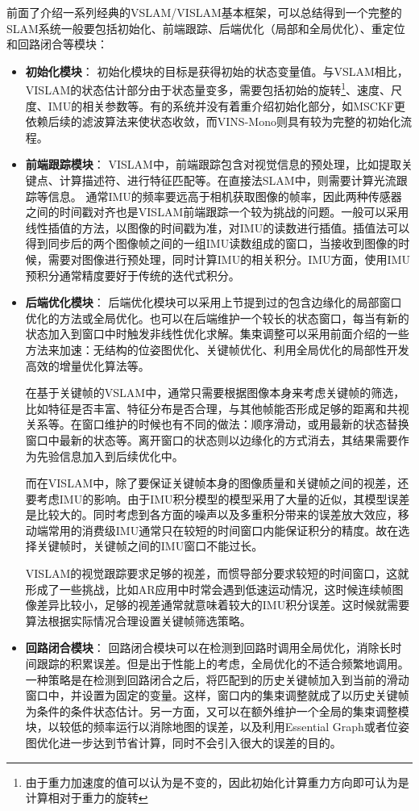 前面了介绍一系列经典的VSLAM/VISLAM基本框架，可以总结得到一个完整的SLAM系统一般要包括初始化、前端跟踪、后端优化（局部和全局优化）、重定位和回路闭合等模块：
\begin{itemize}
    \item \textbf{初始化模块}：
    初始化模块的目标是获得初始的状态变量值。与VSLAM相比，VISLAM的状态估计部分由于状态量变多，需要包括初始的旋转\footnote{由于重力加速度的值可以认为是不变的，因此初始化计算重力方向即可认为是计算相对于重力的旋转}、速度、尺度、IMU的相关参数等。有的系统并没有着重介绍初始化部分，如MSCKF更依赖后续的滤波算法来使状态收敛，而VINS-Mono则具有较为完整的初始化流程。

    \item \textbf{前端跟踪模块}：
    VISLAM中，前端跟踪包含对视觉信息的预处理，比如提取关键点、计算描述符、进行特征匹配等。在直接法SLAM中，则需要计算光流跟踪等信息。
    通常IMU的频率要远高于相机获取图像的帧率，因此两种传感器之间的时间戳对齐也是VISLAM前端跟踪一个较为挑战的问题。一般可以采用线性插值的方法，以图像的时间戳为准，对IMU的读数进行插值。插值法可以得到同步后的两个图像帧之间的一组IMU读数组成的窗口，当接收到图像的时候，需要对图像进行预处理，同时计算IMU的相关积分。IMU方面，使用IMU预积分通常精度要好于传统的迭代式积分。

    \item \textbf{后端优化模块}：
        后端优化模块可以采用上节提到过的包含边缘化的局部窗口优化的方法或全局优化。也可以在后端维护一个较长的状态窗口，每当有新的状态加入到窗口中时触发非线性优化求解。集束调整可以采用前面介绍的一些方法来加速：无结构的位姿图优化、关键帧优化、利用全局优化的局部性开发高效的增量优化算法等。 

        在基于关键帧的VSLAM中，通常只需要根据图像本身来考虑关键帧的筛选，比如特征是否丰富、特征分布是否合理，与其他帧能否形成足够的距离和共视关系等。在窗口维护的时候也有不同的做法：顺序滑动，或用最新的状态替换窗口中最新的状态等。离开窗口的状态则以边缘化的方式消去，其结果需要作为先验信息加入到后续优化中。

    而在VISLAM中，除了要保证关键帧本身的图像质量和关键帧之间的视差，还要考虑IMU的影响。由于IMU积分模型的模型采用了大量的近似，其模型误差是比较大的。同时考虑到各方面的噪声以及多重积分带来的误差放大效应，移动端常用的消费级IMU通常只在较短的时间窗口内能保证积分的精度。故在选择关键帧时，关键帧之间的IMU窗口不能过长。

    VISLAM的视觉跟踪要求足够的视差，而惯导部分要求较短的时间窗口，这就形成了一些挑战，比如AR应用中时常会遇到低速运动情况，这时候连续帧图像差异比较小，足够的视差通常就意味着较大的IMU积分误差。这时候就需要算法根据实际情况合理设置关键帧筛选策略。

    \item \textbf{回路闭合模块}：
    回路闭合模块可以在检测到回路时调用全局优化，消除长时间跟踪的积累误差。但是出于性能上的考虑，全局优化的不适合频繁地调用。一种策略是在检测到回路闭合之后，将匹配到的历史关键帧加入到当前的滑动窗口中，并设置为固定的变量。这样，窗口内的集束调整就成了以历史关键帧为条件的条件状态估计。另一方面，又可以在额外维护一个全局的集束调整模块，以较低的频率运行以消除地图的误差，以及利用Essential Graph或者位姿图优化进一步达到节省计算，同时不会引入很大的误差的目的。
    
\end{itemize}

